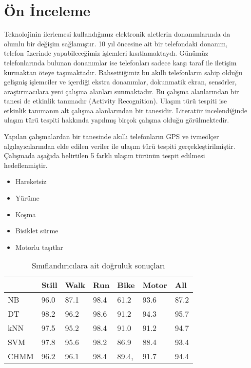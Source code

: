 \chapter{Ön İnceleme}

Teknolojinin ilerlemesi kullandığımız elektronik aletlerin donanımlarında da olumlu bir değişim sağlamıştır. 10 yıl öncesine ait bir telefondaki donanım, telefon üzerinde yapabileceğimiz işlemleri kısıtlamaktaydı. Günümüz telefonlarında bulunan donanımlar ise telefonları sadece karşı taraf ile iletişim kurmaktan öteye taşımaktadır. Bahsettiğimiz bu akıllı telefonların sahip olduğu gelişmiş işlemciler ve içerdiği ekstra donanımlar, dokunmatik ekran, sensörler, araştırmacılara yeni çalışma alanları sunmaktadır. 
Bu çalışma alanlarından bir tanesi de etkinlik tanımadır (Activity Recognition). Ulaşım türü tespiti ise etkinlik tanımanın alt çalışma alanlarından bir tanesidir. Literatür incelendiğinde ulaşım türü tespiti hakkında yapılmış birçok çalışma olduğu görülmektedir.

Yapılan çalışmalardan bir tanesinde \cite{reddy2008determining} akıllı telefonların GPS ve ivmeölçer algılayıcılarından elde edilen veriler ile ulaşım türü tespiti gerçekleştirilmiştir. Çalışmada aşağıda belirtilen 5 farklı ulaşım türünün tespit edilmesi hedeflenmiştir.\begin{itemize}
  \item Hareketsiz
  \item Yürüme
  \item Koşma
  \item Bisiklet sürme
  \item Motorlu taşıtlar
\end{itemize}

\begin{table}[!h]
\centering
\caption{Sınıflandırıcılara ait doğruluk sonuçları }
\label{my-label}
\begin{tabular}{|l|l|l|l|l|l|l|}
\hline
     & Still & Walk & Run  & Bike  & Motor & All  \\ \hline
NB   & 96.0  & 87.1 & 98.4 & 61.2  & 93.6  & 87.2 \\ \hline
DT   & 98.2  & 96.2 & 98.6 & 91.2  & 94.3  & 95.7 \\ \hline
kNN  & 97.5  & 95.2 & 98.4 & 91.0  & 91.2  & 94.7 \\ \hline
SVM  & 97.8  & 95.6 & 98.2 & 86.9  & 88.4  & 93.4 \\ \hline
CHMM & 96.2  & 96.1 & 98.4 & 89.4, & 91.7  & 94.4 \\ \hline
\end{tabular}
\end{table}

